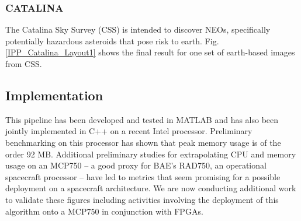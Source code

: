 

\vspace{-0.7cm}
\subsubsection{CATALINA}
The Catalina Sky Survey (CSS) \cite{larson1998catalina,drake2009first} is intended to discover NEOs, specifically potentially hazardous asteroids that pose risk to earth. Fig. \ref{IPP_Catalina_Layout1} 
shows the final result for one set of earth-based images from CSS. 
\vspace{-0.3cm}
\subsection{Implementation}
This pipeline has been developed and tested in MATLAB and has also been jointly implemented in C++ on a recent Intel processor. Preliminary benchmarking on this processor has shown that peak memory usage is of the order 92 MB. Additional preliminary studies for extrapolating CPU and memory usage on an MCP750 -- a good proxy for BAE's RAD750, an operational spacecraft processor -- have led to metrics that seem promising for a possible deployment on a spacecraft architecture. We are now conducting additional work to validate these figures including activities involving the deployment of this algorithm onto a  MCP750  in conjunction with FPGAs. 

